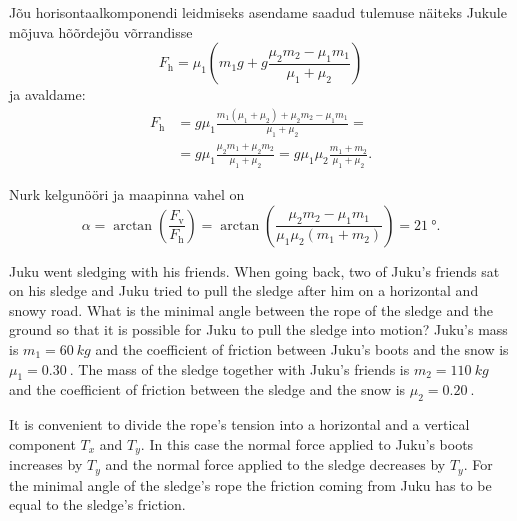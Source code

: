 {Jõu horisontaalkomponendi leidmiseks asendame saadud tulemuse näiteks Jukule mõjuva hõõrdejõu võrrandisse
\begin{equation*}
F_{\mathrm{h}} = \mu_1 \left(m_1 g + g\frac{\mu_2 m_2 - \mu_1 m_1}{\mu_1 + \mu_2}\right)
\end{equation*}
ja avaldame:
\begin{align*}
F_{\mathrm{h}} &= g \mu_1 \frac{m_1 \left(\mu_1 + \mu_2\right) + \mu_2 m_2 - \mu_1 m_1}{\mu_1 + \mu_2} = \\
&= g \mu_1 \frac{\mu_2 m_1 + \mu_2 m_2}{\mu_1 + \mu_2} = g\mu_1\mu_2\frac{m_1+m_2}{\mu_1+\mu_2}.
\end{align*}

Nurk kelgunööri ja maapinna vahel on
\begin{equation*}
\alpha = \arctan\left(\frac{F_{\mathrm{v}}}{F_{\mathrm{h}}}\right) = \arctan\left(\frac{\mu_2 m_2 - \mu_1 m_1}{\mu_1 \mu_2 \left(m_1 + m_2\right)}\right) = \SI{21}{\degree}.
\end{equation*}
\fi


\ifEngStatement
Juku went sledging with his friends. When going back, two of Juku’s friends sat on his sledge and Juku tried to pull the sledge after him on a horizontal and snowy road. What is the minimal angle between the rope of the sledge and the ground so that it is possible for Juku to pull the sledge into motion? Juku’s mass is $m_1 = \SI{60}{kg}$ and the coefficient of friction between Juku’s boots and the snow is $\mu_1 = \SI{0.30}{}$. The mass of the sledge together with Juku’s friends is $m_2 = \SI{110}{kg}$ and the coefficient of friction between the sledge and the snow is $\mu_2 = \SI{0.20}{}$.
\fi


\ifEngHint
It is convenient to divide the rope’s tension into a horizontal and a vertical component $T_x$ and $T_y$. In this case the normal force applied to Juku’s boots increases by $T_y$ and the normal force applied to the sledge decreases by $T_y$. For the minimal angle of the sledge’s rope the friction coming from Juku has to be equal to the sledge’s friction.
\fi


}
